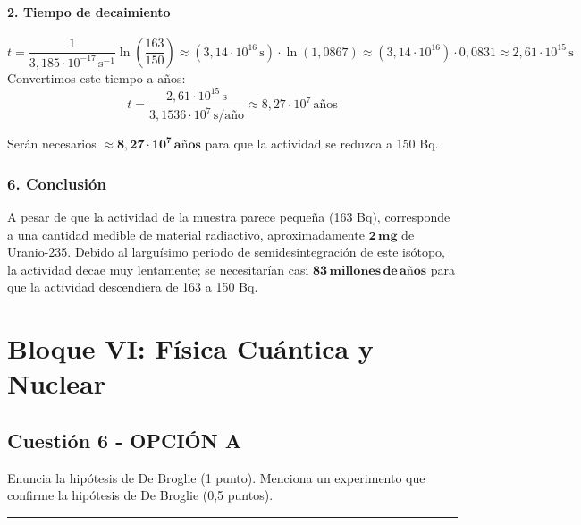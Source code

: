 \paragraph{2. Tiempo de decaimiento}
$$ t = \frac{1}{3,185 \cdot 10^{-17} \, \text{s}^{-1}} \ln\left(\frac{163}{150}\right) \approx (3,14 \cdot 10^{16} \, \text{s}) \cdot \ln(1,0867) \approx (3,14 \cdot 10^{16}) \cdot 0,0831 \approx 2,61 \cdot 10^{15} \, \text{s} $$
Convertimos este tiempo a años:
$$ t = \frac{2,61 \cdot 10^{15} \, \text{s}}{3,1536 \cdot 10^7 \, \text{s/año}} \approx 8,27 \cdot 10^7 \, \text{años} $$
\begin{cajaresultado}
    Serán necesarios $\boldsymbol{\approx 8,27 \cdot 10^7 \, \textbf{años}}$ para que la actividad se reduzca a 150 Bq.
\end{cajaresultado}

\subsubsection*{6. Conclusión}
\begin{cajaconclusion}
A pesar de que la actividad de la muestra parece pequeña (163 Bq), corresponde a una cantidad medible de material radiactivo, aproximadamente $\mathbf{2 \, mg}$ de Uranio-235. Debido al larguísimo periodo de semidesintegración de este isótopo, la actividad decae muy lentamente; se necesitarían casi $\mathbf{83 \, millones \, de \, años}$ para que la actividad descendiera de 163 a 150 Bq.
\end{cajaconclusion}

\newpage

\section{Bloque VI: Física Cuántica y Nuclear}
\label{sec:moderna_2009_sep_ext_2}

\subsection{Cuestión 6 - OPCIÓN A}
\label{subsec:6A_2009_sep_ext}

\begin{cajaenunciado}
Enuncia la hipótesis de De Broglie (1 punto). Menciona un experimento que confirme la hipótesis de De Broglie (0,5 puntos).
\end{cajaenunciado}
\hrule

